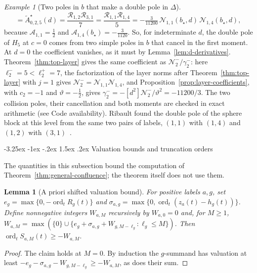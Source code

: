 \documentclass[twoside,10pt]{article}
\makeatletter
\numberwithin{equation}{section}
\theoremstyle{slbody}
\newtheorem{lemma}[theorem]{Lemma}
\theoremstyle{definition}
\theoremstyle{remark}
\newtheorem*{example*}{Example}
\newcommand{\ord}{\operatorname{ord}}
\renewcommand{\subsection}{%
  \@startsection{subsection}{2}{\z@}%
    {-3.25ex \@plus -1ex \@minus -.2ex}%
    {1.5ex \@plus .2ex}%
    {\normalfont\normalsize\bfseries}}
\makeatother
\begin{document}
\begin{example*}[Two poles in \(b\) that make a double pole in \(\Delta\)]
\[ =\widetilde A^\star_{0,2,5}(d)
 =\frac{{\mathcal R}_{1,2}{\mathcal R}_{3,1}}{7}
 =\frac{{\mathcal R}_{1,1}{\mathcal R}_{1,4}}{5}
 =-\tfrac{3}{11200}\,{\mathcal N}_{1,1}(b_\star,d)\,{\mathcal N}_{1,4}(b_\star,d),
\]
because \({\mathcal A}_{1,1}=\tfrac12\) and
\({\mathcal A}_{1,4}(b_\star)=-\tfrac3{1120}\).  So, for indeterminate \(d\), the
double pole of \(H_5\) at \(c=0\) comes from two simple poles in \(b\) that
cancel in the first moment.  At \(d=0\) the coefficient vanishes, as it must by
Lemma~\ref{lem:d-derivatives}.
Theorem~\ref{thm:top-layer} gives the same coefficient as
\(\mathcal N^-_2/\gamma^-_2\): here \(\ell^-_2=5<\ell^+_2=7\), the
factorization of the layer norms after Theorem~\ref{thm:top-layer} with
\(j=1\) gives \(\mathcal N^-_2={\mathcal N}_{1,1}{\mathcal N}_{1,4}\), and
Proposition~\ref{prop:layer-coefficients}, with \(c_2=-1\) and
\(\vartheta=-\tfrac12\), gives \(\gamma^-_2=-[d^2]\mathcal N^-_2/\vartheta^2=-11200/3\).
The two collision poles, their cancellation and both moments are checked in
exact arithmetic (see Code availability).
Ribault found the double pole of the sphere block at this level from the same
two pairs of labels, \((1,1)\) with \((1,4)\) and \((1,2)\) with
\((3,1)\)~\cite[\S3.2, (3.19) and (3.24)]{Ribault2019}.
\end{example*}

\subsection{Valuation bounds and truncation orders}\label{sec:truncation}

The quantities in this subsection bound the computation of
Theorem~\ref{thm:general-confluence}; the theorem itself does not use them.

\begin{lemma}[A priori shifted valuation bound]
\label{lem:shifted-valuation-bound}
For positive labels \(a,g\), set \(e_g=\max\{0,-\ord_tR_g(t)\}\) and
\(\sigma_{a,g}=\max\{0,\ord_t(z_a(t)-h_g(t))\}\).  Define nonnegative integers
\(W_{a,M}\) recursively by \(W_{a,0}=0\) and, for \(M\geq1\),
\(W_{a,M}=\max(\{0\}\cup\{e_g+\sigma_{a,g}+W_{g,M-\ell_g}:\ell_g\leq M\})\).
Then \(\ord_t S_{a,M}(t)\geq-W_{a,M}\).
\end{lemma}

\begin{proof}
The claim holds at \(M=0\). By induction the \(g\)-summand has valuation at
least \(-e_g-\sigma_{a,g}-W_{g,M-\ell_g}\geq-W_{a,M}\), as does their sum.
\end{proof}
\end{document}
